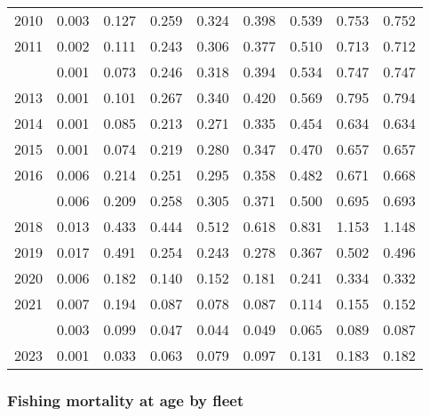 \documentclass[
]{article}
\begin{document}
\begin{longtable}[t]{lrrrrrrrr}
2010 & 0.003 & 0.127 & 0.259 & 0.324 & 0.398 & 0.539 & 0.753 & 0.752\\
2011 & 0.002 & 0.111 & 0.243 & 0.306 & 0.377 & 0.510 & 0.713 & 0.712\\
\addlinespace
2012 & 0.001 & 0.073 & 0.246 & 0.318 & 0.394 & 0.534 & 0.747 & 0.747\\
2013 & 0.001 & 0.101 & 0.267 & 0.340 & 0.420 & 0.569 & 0.795 & 0.794\\
2014 & 0.001 & 0.085 & 0.213 & 0.271 & 0.335 & 0.454 & 0.634 & 0.634\\
2015 & 0.001 & 0.074 & 0.219 & 0.280 & 0.347 & 0.470 & 0.657 & 0.657\\
2016 & 0.006 & 0.214 & 0.251 & 0.295 & 0.358 & 0.482 & 0.671 & 0.668\\
\addlinespace
2017 & 0.006 & 0.209 & 0.258 & 0.305 & 0.371 & 0.500 & 0.695 & 0.693\\
2018 & 0.013 & 0.433 & 0.444 & 0.512 & 0.618 & 0.831 & 1.153 & 1.148\\
2019 & 0.017 & 0.491 & 0.254 & 0.243 & 0.278 & 0.367 & 0.502 & 0.496\\
2020 & 0.006 & 0.182 & 0.140 & 0.152 & 0.181 & 0.241 & 0.334 & 0.332\\
2021 & 0.007 & 0.194 & 0.087 & 0.078 & 0.087 & 0.114 & 0.155 & 0.152\\
\addlinespace
2022 & 0.003 & 0.099 & 0.047 & 0.044 & 0.049 & 0.065 & 0.089 & 0.087\\
2023 & 0.001 & 0.033 & 0.063 & 0.079 & 0.097 & 0.131 & 0.183 & 0.182\\*
\end{longtable}

\subsubsection{Fishing mortality at age by
fleet}\label{fishing-mortality-at-age-by-fleet}
\end{document}
